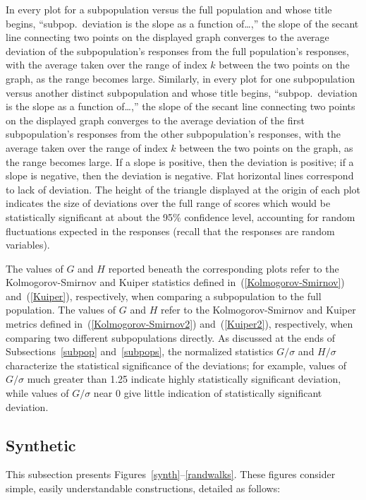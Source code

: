 \documentclass{article}
\begin{document}
In every plot for a subpopulation
versus the full population and whose title begins,
``subpop.\ deviation is the slope as a function of\dots,''
the slope of the secant line connecting two points on the displayed graph
converges to the average deviation of the subpopulation's responses
from the full population's responses,
with the average taken over the range of index $k$ between the two points
on the graph, as the range becomes large.
Similarly, in every plot for one subpopulation
versus another distinct subpopulation and whose title begins,
``subpop.\ deviation is the slope as a function of\dots,''
the slope of the secant line connecting two points on the displayed graph
converges to the average deviation of the first subpopulation's responses
from the other subpopulation's responses,
with the average taken over the range of index $k$ between the two points
on the graph, as the range becomes large.
If a slope is positive, then the deviation is positive;
if a slope is negative, then the deviation is negative.
Flat horizontal lines correspond to lack of deviation.
The height of the triangle displayed at the origin of each plot indicates
the size of deviations over the full range of scores
which would be statistically significant at about the 95\% confidence level,
accounting for random fluctuations expected in the responses
(recall that the responses are random variables).

The values of $G$ and $H$ reported beneath the corresponding plots
refer to the Kolmogorov-Smirnov and Kuiper statistics
defined in~(\ref{Kolmogorov-Smirnov}) and~(\ref{Kuiper}), respectively,
when comparing a subpopulation to the full population.
The values of $G$ and $H$ refer to the Kolmogorov-Smirnov and Kuiper metrics
defined in~(\ref{Kolmogorov-Smirnov2}) and~(\ref{Kuiper2}), respectively,
when comparing two different subpopulations directly.
As discussed at the ends of Subsections~\ref{subpop} and~\ref{subpops},
the normalized statistics $G/\sigma$ and $H/\sigma$ characterize
the statistical significance of the deviations;
for example, values of $G/\sigma$ much greater than 1.25 indicate
highly statistically significant deviation,
while values of $G/\sigma$ near 0 give little indication
of statistically significant deviation.


\subsection{Synthetic}
\label{synthetic}

This subsection presents Figures~\ref{synth}--\ref{randwalks}.
These figures consider simple, easily understandable constructions,
detailed as follows:
\end{document}
